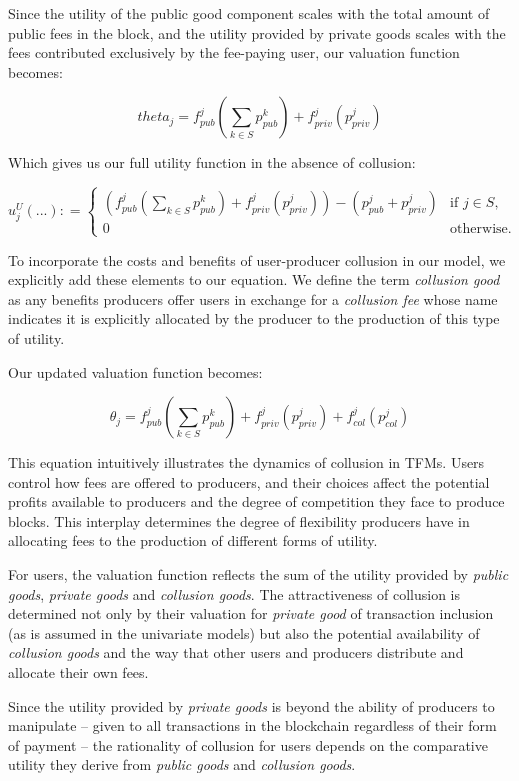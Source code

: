 \documentclass[oneside]{article}   	%
\begin{document}
Since the utility of the public good component scales with the total amount of public fees in the block, and the utility provided by private goods scales with the fees contributed exclusively by the fee-paying user, our valuation function becomes:

$$
theta_j = f_{pub}^j\left(\sum_{k \in S} p_{pub}^{k}\right) + f_{priv}^j(p_{priv}^j)
$$

Which gives us our full utility function in the absence of collusion:

\[
u_j^U\left(...\right) : =
\begin{cases}
\left(
        f_{pub}^j
                \left(\sum_{k \in S} p_{pub}^{k}\right)
                + f_{priv}^j(p_{priv}^j)
\right)  -   \left(p_{pub}^j + p_{priv}^j\right) & \text{if } j \in S, \\ 0 & \text{otherwise.}
\end{cases}
\]

To incorporate the costs and benefits of user-producer collusion in our model, we explicitly add these elements to our equation. We define the term \textit{collusion good} as any benefits producers offer users in exchange for a \textit{collusion fee} whose name indicates it is explicitly allocated by the producer to the production of this type of utility.

Our updated valuation function becomes:

$$
\theta_j = f_{pub}^j\left(\sum_{k \in S} p_{pub}^{k}\right) + f_{priv}^j(p_{priv}^j) + f_{col}^j(p_{col}^j)
$$

This equation intuitively illustrates the dynamics of collusion in TFMs. Users control how fees are offered to producers, and their choices affect the potential profits available to producers and the degree of competition they face to produce blocks. This interplay determines the degree of flexibility producers have in allocating fees to the production of different forms of utility.

For users, the valuation function reflects the sum of the utility provided by \textit{public goods}, \textit{private goods} and \textit{collusion goods}. The attractiveness of collusion is determined not only by their valuation for \textit{private good} of transaction inclusion (as is assumed in the univariate models) but also the potential availability of \textit{collusion goods} and the way that other users and producers distribute and allocate their own fees.

Since the utility provided by \textit{private goods} is beyond the ability of producers to manipulate -- given to all transactions in the blockchain regardless of their form of payment -- the rationality of collusion for users depends on the comparative utility they derive from \textit{public goods} and \textit{collusion goods}.
\end{document}
